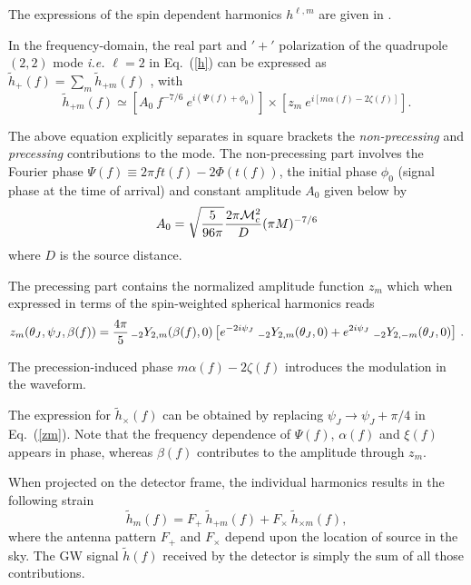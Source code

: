 \documentclass[preprint,onecolumn,,tightenlines,superscriptaddress,showpacs,nofootinbib,eqsecnum,amsfonts,amsmath]{revtex4}
\begin{document}
The expressions of the spin dependent harmonics $h^{\ell, m}$ are given in \cite{waveforms2009,waveforms2011}.

In the frequency-domain, the real part and $'+'$ polarization of the quadrupole
$(2,2)$ mode {\it i.e. $\ell=2$} in Eq.~(\ref{h}) can be expressed as
$\tilde{h}_+(f) = \sum_{m} \tilde{h}_{+m} (f)$ \cite{AS2014}, with
\begin{equation}
\label{hf}
\tilde{h}_{+m}(f) \simeq \left[A_{0}~f^{-7/6}~e^{i (\Psi(f) +\phi_0)}\right] \times \left[z_m~e^{i [m \alpha(f) -2\zeta(f)]}\right].
\end{equation}

The above equation explicitly separates in square brackets the {\it
  non-precessing} and {\it precessing} contributions to the mode.  The
non-precessing part involves the Fourier phase $\Psi(f)\equiv 2\pi f
t(f)-2\Phi(t(f))$, the initial phase $\phi_0$ (signal phase at the time of
arrival) and constant amplitude $A_{0}$ given below by
\begin{equation}
 A_{0}=\sqrt{\frac{5}{96\pi}} \frac{2\pi {\cal M}_c^2}{D} (\pi M )^{-7/6}
 \end{equation}
where $D$ is the source distance.

The precessing part contains the normalized amplitude function $z_m$ which 
when expressed in terms of the spin-weighted spherical harmonics reads
\begin{equation}\label{zm}
z_m(\theta_J, \psi_J, \beta(f)) = \frac{4\pi}{5} \, \mathstrut_{-2}Y_{2,m}(\beta(f), 0)
\left[  e^{-2i\psi_J} \;  \mathstrut_{-2}Y_{2,m}(\theta_J,0) 
+ e^{2i\psi_J}  \; \mathstrut_{-2} Y_{2,-m}(\theta_J,0) \right]\,.
\end{equation}

The precession-induced phase $m\alpha(f)-2\zeta(f)$ introduces the modulation in the waveform.
 
The expression for $\tilde{h}_{\times}(f)$ can be obtained by replacing $\psi_J \rightarrow \psi_J+ \pi/4$ in Eq.~(\ref{zm}). 
Note that the frequency dependence of $\Psi(f)$, $\alpha(f)$ and $\xi(f)$ appears in phase, whereas $\beta(f)$ contributes to the amplitude through $z_m$. 

When projected on the detector frame, the individual harmonics results in the following strain
\begin{equation}\label{hmf}
 \tilde{h}_m(f)=F_{+}~\tilde{h}_{+m}(f)+F_{\times}~\tilde{h}_{\times m}(f),
\end{equation}
where the antenna pattern $F_{+}$ and $F_{\times}$ depend upon the location of source in the sky. 
The GW signal $\tilde{h}(f)$ received by the detector is simply the sum of all those contributions.
\end{document}
